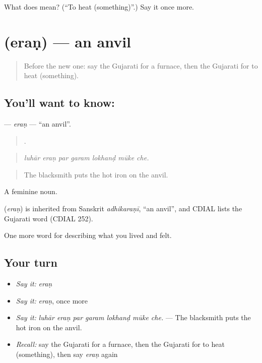 \begin{tcolorbox}[breakable,colback=teal!4,colframe=teal!35!black,title={Before you move on}]
What does  mean? (\textquotedblleft{}To heat (something)\textquotedblright{}.) Say it once more.
\end{tcolorbox}
\section[\texorpdfstring{\gu{એરણ} (eraṇ)}{એરણ (eraṇ)}]{ (eraṇ) — an anvil}

\label{lesson:GU-C508-eran}



\begin{quote}
Before the new one: say the Gujarati for a furnace, then the Gujarati for to heat (something).
\end{quote}

\subsection*{You'll want to know: }
\textbf{} — \emph{eraṇ} — \textquotedblleft{}an anvil\textquotedblright{}.

\begin{quote}
      .
\end{quote}

\begin{quote}
\emph{luhār eraṇ par garam lokhanḍ mūke che.}
\end{quote}

\begin{quote}
The blacksmith puts the hot iron on the anvil.
\end{quote}

A feminine noun.

\begin{cousinweb}
\textbf{} (\emph{eraṇ}) is inherited from Sanskrit \emph{adhikaraṇī}, \textquotedblleft{}an anvil\textquotedblright{}, and CDIAL lists the Gujarati word (CDIAL 252).
\end{cousinweb}

\begin{grammarlens}[title={What you've built}]
One more word for describing what you lived and felt.
\end{grammarlens}

\subsection*{Your turn}
\begin{itemize}
\raggedright
  \item \emph{Say it:} \emph{eraṇ}
  \item \emph{Say it:} \emph{eraṇ}, once more
  \item \emph{Say it:} \emph{luhār eraṇ par garam lokhanḍ mūke che.} — The blacksmith puts the hot iron on the anvil.
  \item \emph{Recall:} say the Gujarati for a furnace, then the Gujarati for to heat (something), then say \emph{eraṇ} again
\end{itemize}

